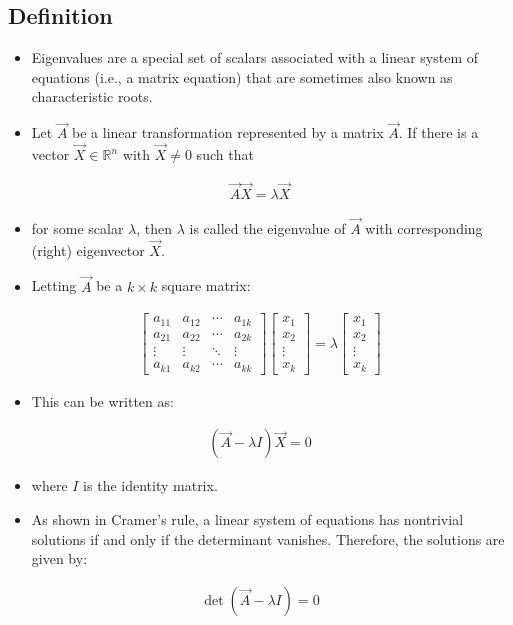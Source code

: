 \documentclass[journal]{IEEEtran}
\begin{document}
\subsection{Definition}
\begin{itemize}
    \item Eigenvalues are a special set of scalars associated with a linear system of equations (i.e., a matrix equation) that are sometimes also known as characteristic roots.
    \item  Let $\vec{A}$ be a linear transformation represented by a matrix $\vec{A}$. If there is a vector $\vec{X} \in \mathbb{R}^n$ with $\vec{X} \neq 0$ such that 
\end{itemize}
\begin{align*}
     \vec{A} \vec{X} = \lambda \vec{X}
\end{align*}
\begin{itemize}
    \item   for some scalar $\lambda$, then $\lambda$ is called the eigenvalue of $\vec{A}$ with corresponding (right) eigenvector $\vec{X}$.
    \item  Letting $\vec{A}$ be a $k \times k$ square matrix:
\end{itemize}
\begin{align*}
    \begin{bmatrix}
      a_{11} & a_{12} & \cdots & a_{1k} \\
      a_{21} & a_{22} & \cdots & a_{2k} \\
      \vdots & \vdots & \ddots & \vdots \\
      a_{k1} & a_{k2} & \cdots & a_{kk}
  \end{bmatrix}
  \begin{bmatrix}
      x_1 \\ x_2 \\ \vdots \\ x_k
  \end{bmatrix}
  = \lambda
  \begin{bmatrix}
      x_1 \\ x_2 \\ \vdots \\ x_k
  \end{bmatrix}
\end{align*}
\begin{itemize}
    \item This can be written as:
\end{itemize}
\begin{align*}
     (\vec{A} - \lambda I)\vec{X} = 0
\end{align*}
\begin{itemize}
    \item where \( I \) is the identity matrix.
    \item As shown in Cramer's rule, a linear system of equations has nontrivial solutions if and only if the determinant vanishes. Therefore, the solutions are given by:
\end{itemize}
\begin{align*}
     \det(\vec{A} - \lambda I) = 0
\end{align*}
\end{document}
